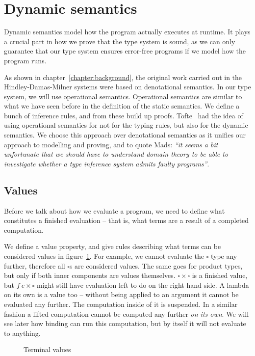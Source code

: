 \section{Dynamic semantics}
Dynamic semantics model how the program actually executes at
runtime. It plays a crucial part in how we prove that the type system
is sound, as we can only guarantee that our type system ensures
error-free programs if we model how the program runs.

As shown in chapter~\ref{chapter:background}, the original work
carried out in the Hindley-Damas-Milner systems were based on
denotational semantics. In our type system, we will use operational
semantics. Operational semantics are similar to what we have seen
before in the definition of the static semantics. We define a bunch of
inference rules, and from these build up proofs. Tofte~\cite{tofte1988}
had the idea of using operational semantics for not for the
typing rules, but also for the dynamic semantics. We choose this
approach over denotational semantics as it unifies our approach to
modelling and proving, and to quote Mads: \textit{``it seems a bit
unfortunate that we should have to understand domain theory to be able
to investigate whether a type inference system admits faulty
programs''}.

\subsection{Values}
Before we talk about how we evaluate a program, we need to
define what constitutes a finished evaluation -- that is, what
terms are a result of a completed computation.

We define a value property, and give rules describing what terms can
be considered values in figure~\ref{fig:values}. For example, we
cannot evaluate the $\square$ type any further, therefore all $\square$s
are considered values. The same goes for product types, but only if
both inner components are values themselves. $\square \times \square$ is a
finished value, but $f \ e \times \square$ might still have evaluation left to
do on the right hand side.
A lambda on its own is a value too --
without being applied to an argument it cannot be evaluated any
further. The computation inside of it is suspended.
In a similar fashion a lifted computation cannot be computed any
further \textit{on its own}. We will see later how binding can run
this computation, but by itself it will not evaluate to anything.

\begin{figure}
  \caption{Terminal values} \label{fig:values}
\end{figure}

